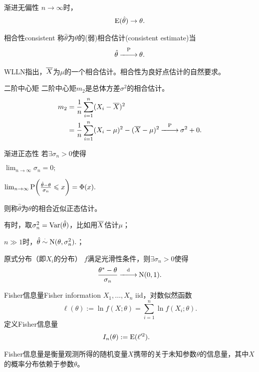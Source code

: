\begin{definition}{渐进无偏性}{}
	$n\to\infty$时，
	\begin{align}
		\E(\hat\theta)\to\theta.
	\end{align}
\end{definition}
\begin{definition}{相合性}{consistent}
	称$\hat\theta$为$\theta$的(弱)相合估计(consistent estimate)当
	\begin{align}
		\hat\theta\pto\theta.
	\end{align}
\end{definition}
WLLN指出，$\avg X$为$\mu$的一个相合估计。相合性为良好点估计的自然要求。
\begin{example}{二阶中心矩}{}
	二阶中心矩$m_2$是总体方差$\sigma^2$的相合估计。
	\begin{align*}
		m_2&=\frac1n\sum_{i=1}^n(X_i-\avg X)^2\\
		&=\frac1n\sum_{i=1}^n(X_i-\mu)^2-(\avg X-\mu)^2\pto\sigma^2+0.
	\end{align*}
\end{example}
\begin{definition}{渐进正态性}{}
	若$\exists\sigma_n>0$使得
	\begin{compactenum}
		\item $\lim_{n\to\infty}\sigma_n=0;$
		\item $\lim_{n\to\infty}\P\biggl(\frac{\hat\theta-\theta}{\sigma_n}\leqslant x\biggr)=\Phi(x).$
	\end{compactenum}
	则称$\hat\theta$为$\theta$的相合近似正态估计。
\end{definition}
\begin{compactenum}
	\item 有时，取$\sigma_n^2=\Var(\hat\theta)$，比如用$\avg X$估计$\mu$；
	\item $n\gg 1$时，$\hat\theta\dotsim\Norm(\theta,\sigma_n^2).$；
	\item 原式分布（即$X_i$的分布） $f$满足光滑性条件，则$\exists\sigma_n>0$使得
	\begin{align}\label{MLE-dto-N01}
		\frac{\theta^\ast-\theta}{\sigma_n}\dto\Norm(0,1).
	\end{align}
\end{compactenum}
\begin{definition}{Fisher信息量}{Fisher information}
	$X_1,\ldots,X_n$ iid，对数似然函数
	\[
		\ell(\theta):=\ln f(X;\theta)=\sum_{i=1}^n\ln f(X_i;\theta).
	\]
	定义Fisher信息量
	\begin{align}
		I_n(\theta)&:=\E(\ell'^2).
	\end{align}
\end{definition}
Fisher信息量是衡量观测所得的随机变量$X$携带的关于未知参数$\theta$的信息量，其中$X$的概率分布依赖于参数$\theta$。


